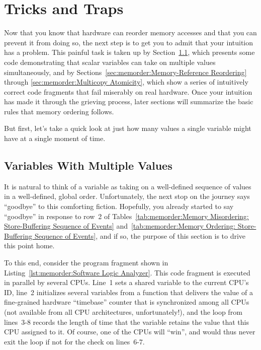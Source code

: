 \section{Tricks and Traps}
\label{sec:memorder:Tricks and Traps}

Now that you know that hardware can reorder memory accesses and that you
can prevent it from doing so, the next step is to get you to admit
that your intuition has a problem.
This painful task is taken up by
Section~\ref{sec:memorder:Variables With Multiple Values},
which presents some code demonstrating that scalar variables can
take on multiple values simultaneously,
and by
Sections~\ref{sec:memorder:Memory-Reference Reordering} through
\ref{sec:memorder:Multicopy Atomicity},
which show a series of intuitively correct code fragments that fail miserably
on real hardware.
Once your intuition has made it through the grieving process, later
sections will summarize the basic rules that memory ordering follows.

But first, let's take a quick look at just how many values a single
variable might have at a single moment of time.

\subsection{Variables With Multiple Values}
\label{sec:memorder:Variables With Multiple Values}

It is natural to think of a variable as taking on a well-defined
sequence of values in a well-defined, global order.
Unfortunately, the next stop on the journey says ``goodbye'' to this comforting fiction.
Hopefully, you already started to say ``goodbye'' in response to row~2 of
Tables~\ref{tab:memorder:Memory Misordering: Store-Buffering Sequence of Events}
and~\ref{tab:memorder:Memory Ordering: Store-Buffering Sequence of Events},
and if so, the purpose of this section is to drive this point home.

To this end, consider the program fragment shown in
Listing~\ref{lst:memorder:Software Logic Analyzer}.
This code fragment is executed in parallel by several CPUs.
Line~1 sets a shared variable to the current CPU's ID, line~2
initializes several variables from a  function that
delivers the value of a fine-grained hardware ``timebase'' counter that is
synchronized among all CPUs (not available from all CPU architectures,
unfortunately!), and the loop from lines~3-8 records the length of
time that the variable retains the value that this CPU assigned to it.
Of course, one of the CPUs will ``win'', and would thus never exit
the loop if not for the check on lines~6-7.


